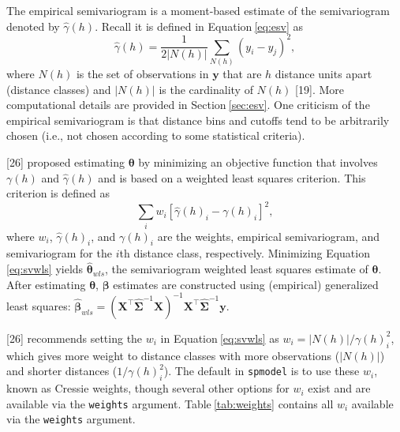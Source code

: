 \documentclass[10pt,letterpaper]{article}
\begin{document}
The empirical semivariogram is a moment-based estimate of the
semivariogram denoted by \(\hat{\gamma}(h)\). Recall it is defined in
Equation\(~\)\ref{eq:esv} as \begin{equation*}
  \hat{\gamma}(h) = \frac{1}{2|N(h)|} \sum_{N(h)} (y_i - y_j)^2, 
\end{equation*} where \(N(h)\) is the set of observations in
\(\mathbf{y}\) that are \(h\) distance units apart (distance classes)
and \(|N(h)|\) is the cardinality of \(N(h)\) {[}19{]}. More
computational details are provided in Section\(~\)\ref{sec:esv}. One
criticism of the empirical semivariogram is that distance bins and
cutoffs tend to be arbitrarily chosen (i.e., not chosen according to
some statistical criteria).

{[}26{]} proposed estimating \(\boldsymbol{\theta}\) by minimizing an
objective function that involves \(\gamma(h)\) and \(\hat{\gamma}(h)\)
and is based on a weighted least squares criterion. This criterion is
defined as \begin{equation}\label{eq:svwls}
  \sum_i w_i [\hat{\gamma}(h)_i - \gamma(h)_i]^2,
\end{equation} where \(w_i\), \(\hat{\gamma}(h)_i\), and \(\gamma(h)_i\)
are the weights, empirical semivariogram, and semivariogram for the
\(i\)th distance class, respectively. Minimizing
Equation\(~\)\ref{eq:svwls} yields \(\boldsymbol{\hat{\theta}}_{wls}\),
the semivariogram weighted least squares estimate of
\(\boldsymbol{\theta}\). After estimating \(\boldsymbol{\theta}\),
\(\boldsymbol{\beta}\) estimates are constructed using (empirical)
generalized least squares:
\(\boldsymbol{\hat{\beta}}_{wls} = (\mathbf{X}^\top \hat{\mathbf{\Sigma}}^{-1} \mathbf{X})^{-1} \mathbf{X}^\top \hat{\mathbf{\Sigma}}^{-1} \mathbf{y}\).

{[}26{]} recommends setting the \(w_i\) in Equation\(~\)\ref{eq:svwls}
as \(w_i = |N(h)| / \gamma(h)_i^2\), which gives more weight to distance
classes with more observations (\(|N(h)|\)) and shorter distances
(\(1 / \gamma(h)_i^2\)). The default in \texttt{spmodel} is to use these
\(w_i\), known as Cressie weights, though several other options for
\(w_i\) exist and are available via the \texttt{weights} argument.
Table\(~\)\ref{tab:weights} contains all \(w_i\) available via the
\texttt{weights} argument.
\end{document}
